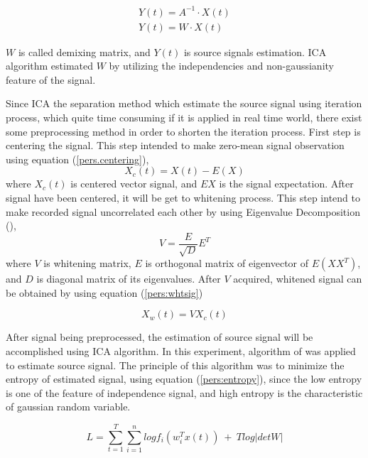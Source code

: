 \documentclass[a4paper]{jpconf}
\begin{document}
\begin{equation}\label{pers:estimation}
\begin{aligned}
Y(t)=A^{-1}\cdot X(t)\\
Y(t)=W\cdot X(t)
\end{aligned}
\end{equation}

$W$ is called demixing matrix, and $Y(t)$ is source signals estimation. ICA algorithm estimated $W$ by utilizing the independencies and non-gaussianity feature of the signal.

Since ICA the separation method which estimate the source signal using iteration process, which quite time consuming if it is applied in real time world, there exist some preprocessing method in order to shorten the iteration process. First step is centering the signal. This step intended to make zero-mean signal observation using equation (\ref{pers.centering}),
\begin{equation}\label{pers.centering}
X_c(t) = X(t) - E(X)
\end{equation}
where $X_c(t)$ is centered vector signal, and $E{X}$ is the signal expectation. After signal have been centered, it will be get to whitening process. This step intend to make recorded signal uncorrelated each other by using Eigenvalue Decomposition (\label{pers:decomp}),
\begin{equation}\label{pers:decomp}
V = \frac{E}{\sqrt{D}}E^T
\end{equation}
where $V$ is whitening matrix, $E$ is orthogonal matrix of eigenvector of $E(XX^T)$, and $D$ is diagonal matrix of its eigenvalues. After $V$ acquired, whitened signal can be obtained by using equation (\ref{pers:whtsig})

\begin{equation}\label{pers:whtsig}
X_w(t) = V X_c(t)
\end{equation}

After signal being preprocessed, the estimation of source signal will be accomplished using ICA algorithm. In this experiment, algorithm of \cite{5} was applied to estimate source signal. The principle of this algorithm was to minimize the entropy of estimated signal, using equation (\ref{pers:entropy}), since the low entropy is one of the feature of independence signal, and high entropy is the characteristic of gaussian random variable.

\begin{equation}\label{pers:entropy}
L = \sum_{t=1}^T \sum_{i=1}^n log f_i \left(w_i^T x(t)\right) ~+~ T log |det W|
\end{equation}
\end{document}
